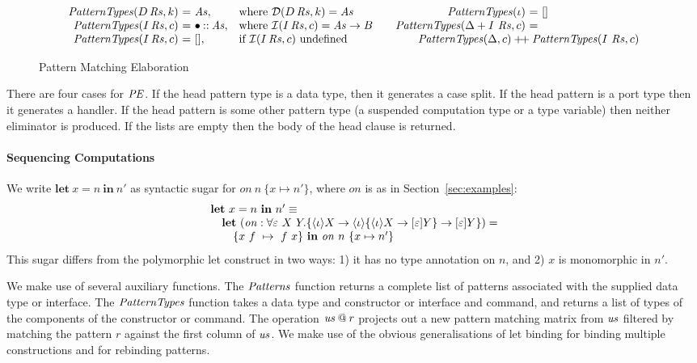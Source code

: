 \documentclass{sigplanconf}
\makeatletter
\newcommand\ba{\begin{array}}
\newcommand\ea{\end{array}}
\newcommand{\bstack}{\begin{array}[t]{@{}l@{}}}
\newcommand{\estack}{\end{array}}
\newenvironment{eqs}{\ba{@{}r@{~}c@{~}l@{}}}{\ea}
\newcommand{\key}[1]{\mathbf{#1}} %
\newcommand{\var}{\mathit}        %
\newcommand{\thunk}[1]{\{{#1}\}}
\newcommand{\evd}{\varepsilon}
\newcommand{\effin}[1]{\langle {#1} \rangle}
\newcommand{\effout}[1]{[{#1}]}
\newcommand{\id}{\iota}
\makeatother
\begin{document}
\begin{figure*}
\[
\ba{@{}r@{~}c@{~}l@{\quad}l@{}}
\PatternTypes(D\,\Rs, k) &=& \As, & \text{where }\dcon(D\,\Rs, k) = \As \\
\PatternTypes(I\,\Rs, c) &=& \bullet \cons \As,   & \text{where }\icom(I\,\Rs, c) = \As \to B \\
\PatternTypes(I\,\Rs, c) &=& [], & \text{if }\icom(I\,\Rs, c)\text{ undefined} \\
\ea
\qquad
\begin{eqs}
\PatternTypes(\id) &=& \emptylist \\
\PatternTypes(\Delta + I~\Rs, c) &=& \\
\multicolumn{3}{@{\qquad}l@{}}{\PatternTypes(\Delta, c) \concat \PatternTypes(I~\Rs, c)} \\
\end{eqs}
\]

\caption{Pattern Matching Elaboration}
\label{fig:pattern-matching-elaboration}
\end{figure*}
%
There are four cases for $\mathit{PE}$. If the head pattern type is a data type,
then it generates a case split. If the head pattern is a port type
then it generates a handler. If the head pattern is some other pattern
type (a suspended computation type or a type variable) then neither
eliminator is produced. If the lists are empty then the body of the
head clause is returned.

\paragraph{Sequencing Computations}
We write $\key{let}~x=n~\key{in}~n'$ as syntactic sugar for
$\var{on}~n~\thunk{x \mapsto n'}$, where $\var{on}$ is as in
Section~\ref{sec:examples}:
%
\[
\bstack
\key{let}~x=n~\key{in}~n' \equiv \\
\quad \key{let}~
  (\var{on} :
    \forall \evd~X~Y.
       \thunk{\effin{\id}X \to \effin{\id}\thunk{\effin{\id}X \to \effout{\evd}Y} \to \effout{\evd}Y}) = \\
  \qquad \thunk{x~f~\mapsto~f~x}~\key{in}~\var{on}~n~\thunk{x \mapsto n'}
\estack
\]
This sugar differs from the polymorphic let construct in two ways: 1)
it has no type annotation on $n$, and 2) $x$ is monomorphic in $n'$.
\medskip

We make use of several auxiliary functions. The $\Patterns$ function
returns a complete list of patterns associated with the supplied data
type or interface. The $\PatternTypes$ function takes a data type and
constructor or interface and command, and returns a list of types of
the components of the constructor or command. The operation $\us \proj
r$ projects out a new pattern matching matrix from $\us$ filtered by
matching the pattern $r$ against the first column of $\us$. We make
use of the obvious generalisations of let binding for binding multiple
constructions and for rebinding patterns.
\end{document}
